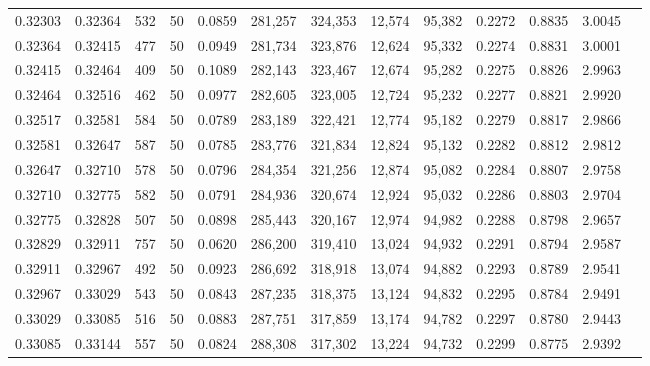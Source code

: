 \begin{tabular}{rrrrrrrrrrrrr}
0.32303 & 0.32364 &   532 &  50 &                                     0.0859 & 281,257 & 324,353 &  12,574 &  95,382 & 0.2272 & 0.8835 & 3.0045 \\
0.32364 & 0.32415 &   477 &  50 &                                     0.0949 & 281,734 & 323,876 &  12,624 &  95,332 & 0.2274 & 0.8831 & 3.0001 \\
0.32415 & 0.32464 &   409 &  50 &                                     0.1089 & 282,143 & 323,467 &  12,674 &  95,282 & 0.2275 & 0.8826 & 2.9963 \\
0.32464 & 0.32516 &   462 &  50 &                                     0.0977 & 282,605 & 323,005 &  12,724 &  95,232 & 0.2277 & 0.8821 & 2.9920 \\
0.32517 & 0.32581 &   584 &  50 &                                     0.0789 & 283,189 & 322,421 &  12,774 &  95,182 & 0.2279 & 0.8817 & 2.9866 \\
0.32581 & 0.32647 &   587 &  50 &                                     0.0785 & 283,776 & 321,834 &  12,824 &  95,132 & 0.2282 & 0.8812 & 2.9812 \\
0.32647 & 0.32710 &   578 &  50 &                                     0.0796 & 284,354 & 321,256 &  12,874 &  95,082 & 0.2284 & 0.8807 & 2.9758 \\
0.32710 & 0.32775 &   582 &  50 &                                     0.0791 & 284,936 & 320,674 &  12,924 &  95,032 & 0.2286 & 0.8803 & 2.9704 \\
0.32775 & 0.32828 &   507 &  50 &                                     0.0898 & 285,443 & 320,167 &  12,974 &  94,982 & 0.2288 & 0.8798 & 2.9657 \\
0.32829 & 0.32911 &   757 &  50 &                                     0.0620 & 286,200 & 319,410 &  13,024 &  94,932 & 0.2291 & 0.8794 & 2.9587 \\
0.32911 & 0.32967 &   492 &  50 &                                     0.0923 & 286,692 & 318,918 &  13,074 &  94,882 & 0.2293 & 0.8789 & 2.9541 \\
0.32967 & 0.33029 &   543 &  50 &                                     0.0843 & 287,235 & 318,375 &  13,124 &  94,832 & 0.2295 & 0.8784 & 2.9491 \\
0.33029 & 0.33085 &   516 &  50 &                                     0.0883 & 287,751 & 317,859 &  13,174 &  94,782 & 0.2297 & 0.8780 & 2.9443 \\
0.33085 & 0.33144 &   557 &  50 &                                     0.0824 & 288,308 & 317,302 &  13,224 &  94,732 & 0.2299 & 0.8775 & 2.9392 \\

\end{tabular}
